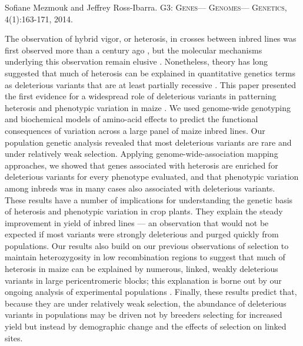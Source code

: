 \documentclass[11pt,letterpaper]{article}
\begin{document}
\large{ 
Sofiane Mezmouk and Jeffrey Ross-Ibarra.
\textsc{G3: Genes— Genomes— Genetics}, 4(1):163-171, 2014.}

\vspace{1cm}

\noindent The observation of hybrid vigor, or heterosis, in crosses between inbred lines was first observed more than a century ago \citep{shull1908composition,shull1914duplicate}, but the molecular mechanisms underlying this observation remain elusive \citep{schnable2013progress, chen2013genomic}.
Nonetheless, theory has long suggested that much of heterosis can be explained in quantitative genetics terms as deleterious variants that are at least partially recessive \citep{charlesworth2009genetics}.
This paper presented the first evidence for a widespread role of deleterious variants in patterning heterosis and phenotypic variation in maize \citep{mezmouk2014pattern}.
We used genome-wide genotyping and biochemical models of amino-acid effects to predict the functional consequences of variation across a large panel of maize inbred lines.
Our population genetic analysis revealed that most deleterious variants are rare and under relatively weak selection.
Applying genome-wide-association mapping approaches, we showed that genes associated with heterosis are enriched for deleterious variants for every phenotype evaluated, and that phenotypic variation among inbreds was in many cases also associated with deleterious variants.\\

\noindent These results have a number of implications for understanding the genetic basis of heterosis and phenotypic variation in crop plants. 
They explain the steady improvement in yield of inbred lines --- an observation that would not be expected if most variants were strongly deleterious and purged quickly from populations.
Our results also build on our previous observations of selection to maintain heterozygosity in low recombination regions \citep{gore2009a-first-generation} to suggest that much of heterosis in  maize can be explained by numerous, linked, weakly deleterious variants in large pericentromeric blocks; this explanation is borne out by our ongoing analysis of experimental populations \citep{gerke2013genomic}.
Finally, these results predict that, because they are under relatively weak selection, the abundance of deleterious variants in populations may be driven not by breeders selecting for increased yield but instead by demographic change and the effects of selection on linked sites.


\end{document}
